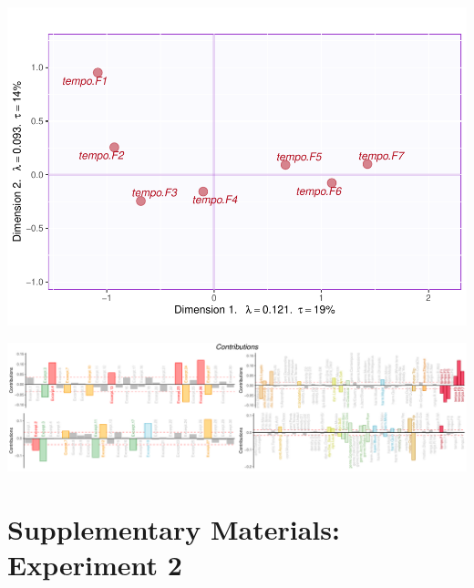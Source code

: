 \documentclass[
]{article}
\begin{document}
\includegraphics[width=0.5\linewidth]{MusDes_Supplementary_files/figure-latex/morecolmaps-11}

\begin{center}\includegraphics{MusDes_Supplementary_files/figure-latex/contributionsqsup-1} \end{center}

\hypertarget{supplementary-materials-experiment-2}{%
\section{Supplementary Materials: Experiment
2}\label{supplementary-materials-experiment-2}}
\end{document}
